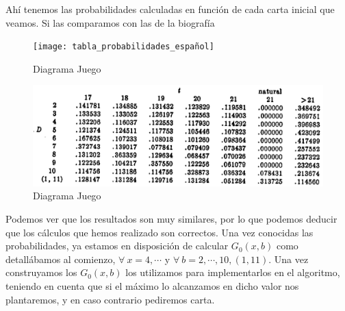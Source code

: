 \documentclass[12pt,a4paper,]{book}
\numberwithin{dummy}{section}
\theoremstyle{ocrenumbox}
\theoremstyle{blacknumex}
\theoremstyle{blacknumbox}
\theoremstyle{ocrenum}
\theoremstyle{ocrenum}
\begin{document}
Ahí tenemos las probabilidades calculadas en función de cada carta
inicial que veamos. Si las comparamos con las de la biografía

\begin{figure}[H]

{\centering \texttt{[image: tabla\_probabilidades\_español]} 

}

\caption{\label{forma_extensiva}Diagrama Juego}\label{fig:español_blackjack}
\end{figure}

\begin{figure}[H]

{\centering \includegraphics[width=0.8\linewidth]{tabla_probabilidades_baldwin} 

}

\caption{\label{forma_extensiva}Diagrama Juego}\label{fig:ingles_blackjack}
\end{figure}

Podemos ver que los resultados son muy similares, por lo que podemos
deducir que los cálculos que hemos realizado son correctos. Una vez
conocidas las probabilidades, ya estamos en disposición de calcular
\(G_0(x,b)\) como detallábamos al comienzo, \(\forall \ x=4,\cdots\) y
\(\forall \  b=2,\cdots,10,(1,11)\). Una vez construyamos los
\(G_0(x,b)\) los utilizamos para implementarlos en el algoritmo,
teniendo en cuenta que si el máximo lo alcanzamos en dicho valor nos
plantaremos, y en caso contrario pediremos carta.

\begingroup\fontsize{12}{14}\selectfont
\end{document}
